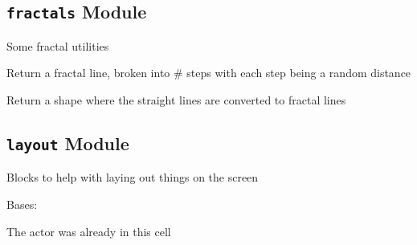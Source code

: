 \documentclass[letterpaper,10pt,english]{sphinxmanual}
\begin{document}
\subsection{\texttt{fractals} Module}
\label{blocks:fractals-module}\label{blocks:module-serge.blocks.fractals}
Some fractal utilities

\begin{fulllineitems}
\label{blocks:serge.blocks.fractals.fractalLine}
Return a fractal line, broken into \# steps with each step being a random distance

\end{fulllineitems}


\begin{fulllineitems}
\label{blocks:serge.blocks.fractals.fractalShape}
Return a shape where the straight lines are converted to fractal lines

\end{fulllineitems}



\subsection{\texttt{layout} Module}
\label{blocks:layout-module}\label{blocks:module-serge.blocks.layout}
Blocks to help with laying out things on the screen

\begin{fulllineitems}
\label{blocks:serge.blocks.layout.AlreadyInCell}
Bases: 

The actor was already in this cell

\end{fulllineitems}

\end{document}

